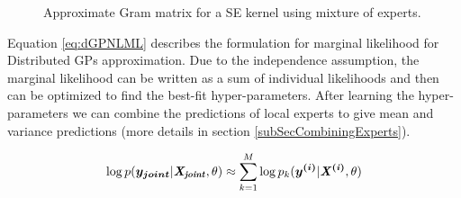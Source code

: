 \begin{figure}[!ht]
  \centering
  \quad
  \caption{Approximate Gram matrix for a SE kernel using mixture of experts.}
  \label{figDGPMTGP}
\end{figure}

Equation \ref{eq:dGPNLML} describes the formulation for marginal likelihood for Distributed GPs approximation. Due to the independence assumption, the marginal likelihood can be written as a sum of individual likelihoods and then can be optimized to find the best-fit hyper-parameters. After learning the hyper-parameters we can combine the predictions of local experts to give mean and variance predictions (more details in section \ref{subSecCombiningExperts}). 

\begin{align}\label{eq:dGPNLML}
    \log p(\boldsymbol{y_{joint}}| \bm{\mathit{X_{joint}}}, \theta) \approx \sum_{k=1}^{M} \log p_{k}(\boldsymbol{y^{(i)}}| \bm{\mathit{X^{(i)}}}, \theta)
 \end{align}

